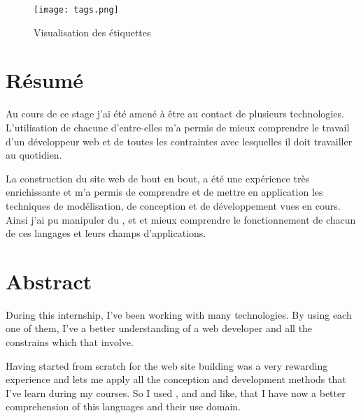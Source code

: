 \documentclass[a4paper, 11pt]{report}
\begin{document}
    \begin{figure}[!ht]
        \centerline{\texttt{[image: tags.png]}}
        \caption{Visualisation des étiquettes}
        \label{tags}
    \end{figure}




\newpage
\thispagestyle{empty}
    \section*{Résumé}
    Au cours de ce stage j'ai été amené à être au contact de plusieurs technologies. L'utilisation de chacune d'entre-elles m'a permis de mieux comprendre le travail d'un développeur web et de toutes les contraintes avec lesquelles il doit travailler au quotidien.

    La construction du site web de bout en bout, a été une expérience très enrichissante et m'a permis de comprendre et de mettre en application les techniques de modélisation, de conception et de développement vues en cours. Ainsi j'ai pu manipuler du \php, \js et \jq et mieux comprendre le fonctionnement de chacun de ces langages et leurs champs d'applications.
    \section*{Abstract}
    During this internship, I've been working with many technologies. By using each one of them, I've a better understanding of a web developer and all the constrains which that involve.

    Having started from scratch for the web site building was a very rewarding experience and lets me apply all the conception and development methods that I've learn during my courses. So I used \php, \js and \jq and like, that I have now a better comprehension of this languages and their use domain.
\end{document}
